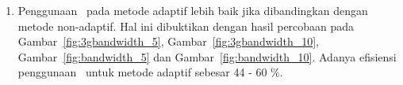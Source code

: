 \begin{enumerate}
  \item Penggunaan \bandwidth~pada metode adaptif lebih baik jika dibandingkan
    dengan metode non-adaptif. Hal ini dibuktikan dengan hasil percobaan pada
    Gambar~\ref{fig:3gbandwidth_5}, Gambar~\ref{fig:3gbandwidth_10},
    Gambar~\ref{fig:bandwidth_5} dan Gambar~\ref{fig:bandwidth_10}. Adanya
    efisiensi penggunaan \bandwidth~untuk metode adaptif sebesar 44 - 60 \%.





\end{enumerate}
